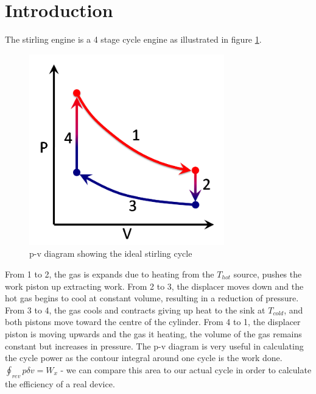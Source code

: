 \documentclass[12pt]{article}
\begin{document}
    \section{Introduction}
        The stirling engine is a 4 stage cycle engine as illustrated in figure \ref{stirlingcycle}.
        \begin{figure}[H]
            \captionsetup{labelfont=bf}
            \includegraphics[width=20pc]{stirlingcycle.png}
            \caption{p-v diagram showing the ideal stirling cycle}\label{stirlingcycle}
        \end{figure}
        From 1 to 2, the gas is expands due to heating from the $T_{hot}$ source, pushes the work piston up extracting work. From 2 to 3, the displacer moves down and the hot gas
        begins to cool at constant volume, resulting in a reduction of pressure. From 3 to 4, the gas cools and contracts giving up heat to the sink at $T_{cold}$, and both pistons
        move toward the centre of the cylinder. From 4 to 1, the displacer piston is moving upwards and the gas it heating, the volume of the gas remains constant but increases in pressure.
        The p-v diagram is very useful in calculating the cycle power as the contour integral around one cycle is the work done. $\oint_{rev}p \delta v = W_x$ - we can compare this area 
        to our actual cycle in order to calculate the efficiency of a real device.
\end{document}

